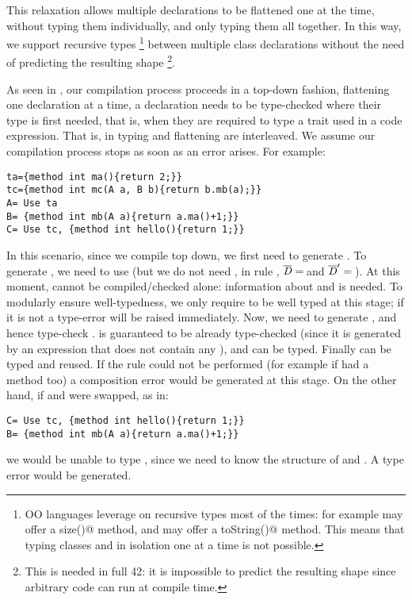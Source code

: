 This relaxation allows multiple declarations to be flattened one at the time, without typing them individually, and only typing them all together.
In this way, we support recursive types%
\footnote{
OO languages leverage on recursive types most of the times:
for example \Q@String@ may offer a \Q@Int size()@
method, and \Q@Int@ may offer a \Q@String toString()@ method.
This means that typing classes 
\Q@String@ and \Q@Int@ in isolation one at a time is not possible.}
between multiple class declarations without
the need of predicting the resulting shape%
\footnote{This is needed in full 42: it is
impossible to predict the resulting shape since
arbitrary code can run at compile time.}.

As seen in , our compilation process
proceeds in a top-down fashion, flattening one declaration at a time,
a declaration needs
to be type-checked where their type is first needed,
that is, when they are required to type a trait used in a code expression.
That is, in \name typing and flattening are interleaved. We assume our compilation process stops as soon as 
an error arises. 
For example:
\saveSpace\saveSpace\begin{lstlisting}
ta={method int ma(){return 2;}}
tc={method int mc(A a, B b){return b.mb(a);}}
A= Use ta
B= {method int mb(A a){return a.ma()+1;}}
C= Use tc, {method int hello(){return 1;}}
\end{lstlisting}\saveSpace\saveSpace
In this scenario, since we compile top down, we first need to generate \Q@A@.
To generate \Q@A@, we need to use \Q@ta@ (but we do not need
\Q@tc@, in rule , $\overline{\mathit{D}}=\,$\Q@ta@ and $\overline{\mathit{D}}'=\,$\Q@tc@).
At this moment, \Q@tc@ cannot be compiled/checked alone:
information about \Q@A@ and \Q@B@ is needed.
To modularly ensure well-typedness,
we only require \Q@ta@ to be well typed at this stage; if it is not a type-error will be raised immediately. %
Now, we need to generate \Q@C@, and hence type-check \Q@tc@.
\Q@A@ is guaranteed to be already type-checked 
(since it is generated by an expression that does not contain any \mL),
and \Q@B@ can be typed. Finally \Q@tc@ can be typed and reused.
If the  rule could not be performed (for example if \Q@tc@ had a method \Q@hello@ too)
a composition error would be generated at this stage.
On the other hand, if \Q@B@ and \Q@C@ were swapped, as in:
\saveSpace\saveSpace\begin{lstlisting}
C= Use tc, {method int hello(){return 1;}}
B= {method int mb(A a){return a.ma()+1;}}
\end{lstlisting}\saveSpace\saveSpace
\noindent
we would be unable to type \Q@tc@, since we need to know the structure of \Q@A@ and \Q@B@.
A type error would be generated.%

